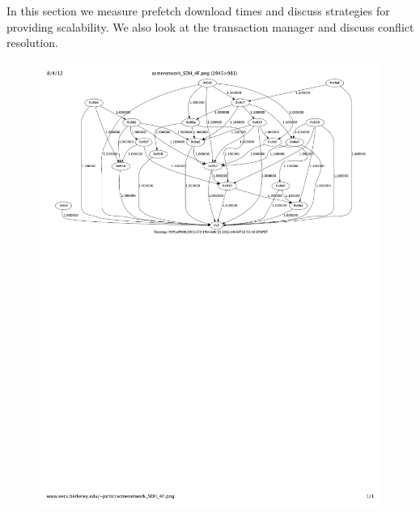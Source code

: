 


In this section we measure prefetch download times and discuss strategies for providing scalability.  We also
look at the transaction manager and discuss conflict resolution.

\begin{figure}[htb!]
\begin{center}
\includegraphics[scale=0.8]{figs/acmenetwork_SDH_4F}
\caption{}
\label{fig:acmenetwork_SDH_4F}
\end{center}
\end{figure}
